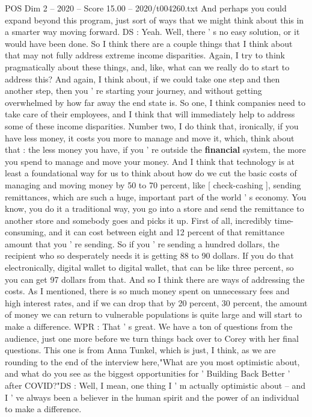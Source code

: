 \begin{textsample}{POS Dim 2 – 2020 – Score 15.00 – 2020/t004260.txt}
And perhaps you could expand beyond this program, just sort of ways that we might think about this in a smarter way moving forward.
DS : Yeah.
Well, there ' s no easy solution, or it would have been done.
So I think there are a couple things that I think about that may not fully address extreme income disparities.
Again, I try to think pragmatically about these things, and, like, what can we really do to start to address this?
And again, I think about, if we could take one step and then another step, then you ' re starting your journey, and without getting overwhelmed by how far away the end state is.
So one, I think companies need to take care of their employees, and I think that will immediately help to address some of these income disparities.
Number two, I do think that, ironically, if you have less money, it costs you more to manage and move it, which, think about that : the less money you have, if you ' re outside the \textbf{financial} system, the more you spend to manage and move your money.
And I think that technology is at least a foundational way for us to think about how do we cut the basic costs of managing and moving money by 50 to 70 percent, like [ check-cashing ], sending remittances, which are such a huge, important part of the world ' s economy.
You know, you do it a traditional way, you go into a store and send the remittance to another store and somebody goes and picks it up.
First of all, incredibly time-consuming, and it can cost between eight and 12 percent of that remittance amount that you ' re sending.
So if you ' re sending a hundred dollars, the recipient who so desperately needs it is getting 88 to 90 dollars.
If you do that electronically, digital wallet to digital wallet, that can be like three percent, so you can get 97 dollars from that.
And so I think there are ways of addressing the costs.
As I mentioned, there is so much money spent on unnecessary fees and high interest rates, and if we can drop that by 20 percent, 30 percent, the amount of money we can return to vulnerable populations is quite large and will start to make a difference.
WPR : That ' s great.
We have a ton of questions from the audience, just one more before we turn things back over to Corey with her final questions.
This one is from Anna Tunkel, which is just, I think, as we are rounding to the end of the interview here,"What are you most optimistic about, and what do you see as the biggest opportunities for ' Building Back Better ' after COVID?"DS : Well, I mean, one thing I ' m actually optimistic about -- and I ' ve always been a believer in the human spirit and the power of an individual to make a difference.

\end{textsample}
